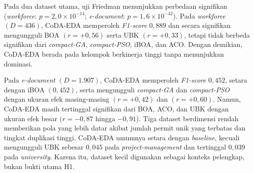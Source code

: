 Pada dua dataset utama, uji Friedman menunjukkan perbedaan signifikan (\textit{workforce}: $p=2{,}0\times10^{-14}$; \textit{e-document}: $p=1{,}6\times10^{-42}$). 
Pada \textit{workforce} $(D=436)$, CoDA-EDA memperoleh \textit{F1-score} $0,889$ dan secara signifikan mengungguli BOA $(r={+}0{,}56)$ serta UBK $(r={+}0{,}33)$, tetapi tidak berbeda signifikan dari \textit{compact-GA}, \textit{compact-PSO}, iBOA, dan ACO. 
Dengan demikian, CoDA-EDA berada pada kelompok berkinerja tinggi tanpa menunjukkan dominasi.

Pada \textit{e-document} $(D=1.907)$, CoDA-EDA memperoleh \textit{F1-score} $0,452$, setara dengan iBOA $(0,452)$, serta mengungguli \textit{compact-GA} dan \textit{compact-PSO} dengan ukuran efek masing-masing $(r={+}0{,}42)$ dan $(r={+}0{,}60)$. 
Namun, CoDA-EDA masih tertinggal signifikan dari BOA, ACO, dan UBK dengan ukuran efek besar $(r={-}0{,}87$ hingga ${-}0{,}91$). 
Tiga dataset berdimensi rendah memberikan pola yang lebih datar akibat jumlah permit unik yang terbatas dan tingkat duplikasi tinggi. 
CoDA-EDA umumnya setara dengan \textit{baseline}, kecuali mengungguli UBK sebesar $0,045$ pada \textit{project-management} dan tertinggal $0,039$ pada \textit{university}. 
Karena itu, dataset kecil digunakan sebagai konteks pelengkap, bukan bukti utama H1.

